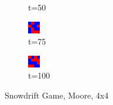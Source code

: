 \documentclass[a4paper, 11pt]{article}
\begin{document}
\begin{figure}[H]
\begin{subfigure}{.25\textwidth}
  \caption{t=50}
\end{subfigure}%
\begin{subfigure}{.25\textwidth}
  \centering
  \includegraphics[width=0.9\linewidth]{SNOWDRIFT_MOORE_4x4_t75}
  \caption{t=75}
\end{subfigure}%
\begin{subfigure}{.25\textwidth}
  \centering
  \includegraphics[width=0.9\linewidth]{SNOWDRIFT_MOORE_4x4_t100}
  \caption{t=100}
\end{subfigure}
\caption{Snowdrift Game, Moore, 4x4}
\end{figure}
\end{document}
